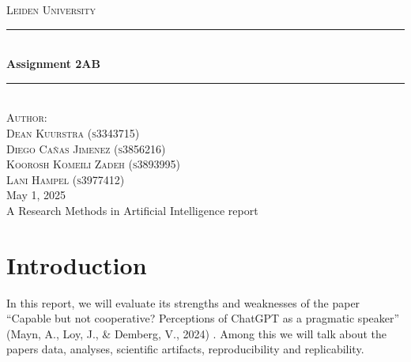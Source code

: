 \documentclass[12pt]{article}
\begin{document}

\begin{titlepage}

\newcommand{\HRule}{\rule{\linewidth}{0.5mm}}

\center
\begin{figure}[H]  \end{figure}
\textsc{\LARGE Leiden University}\\[1.5cm]


\HRule \\[0.9cm]
{ \huge \bfseries Assignment 2AB}\\[0.1cm] %
\HRule \\[1.5cm]

\textsc{Author:}\\[0.3cm]
\textsc{\Large Dean Kuurstra (s3343715)}\\[0.5cm]
\textsc{\Large Diego Cañas Jimenez (s3856216)}\\[0.5cm]
\textsc{\Large Koorosh Komeili Zadeh (s3893995)}\\[0.5cm]
\textsc{\Large Lani Hampel (s3977412)}\\[0.5cm]

\large May 1, 2025\\
A Research Methods in Artificial Intelligence report\\

\vfill %

\end{titlepage}

\newpage
\section{Introduction}
In this report, we will evaluate its strengths and weaknesses of the paper “Capable but not cooperative? Perceptions of ChatGPT as a pragmatic speaker” (Mayn, A., Loy, J., \& Demberg, V., 2024) \cite{pragmatic_gpt}. Among this we will talk about the papers data, analyses, scientific artifacts, reproducibility and replicability.
\end{document}
